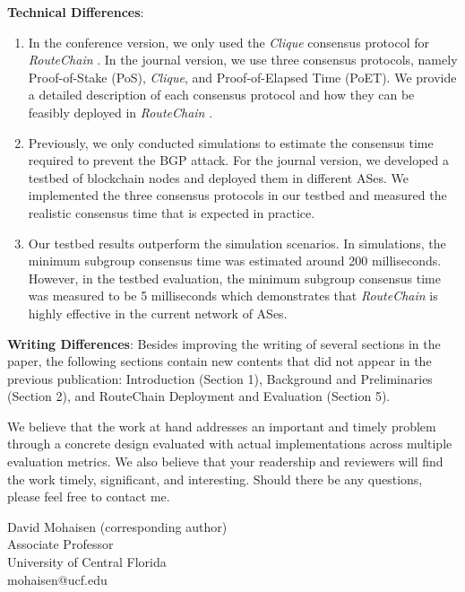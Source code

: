 \documentclass{abmart}
\newcommand{\rc}{{{\em RouteChain }}}
\begin{document}
\noindent\textbf{Technical Differences}:  
\vspace{-4mm}
\begin{enumerate}
\itemsep-0.3em 
    \item In the conference version, we only used the {\em Clique} consensus protocol for \rc. In the journal version, we use three consensus protocols, namely Proof-of-Stake (PoS), {\em Clique}, and Proof-of-Elapsed Time (PoET). We provide a detailed description of each consensus protocol and how they can be feasibly deployed in \rc. 
    \item Previously, we only conducted simulations to estimate the consensus time required to prevent the BGP attack. For the journal version, we developed a testbed of blockchain nodes and deployed them in different ASes. We implemented the three consensus protocols in our testbed and measured the realistic consensus time that is expected in practice. 
    \item Our testbed results outperform the simulation scenarios. In simulations, the minimum subgroup consensus time was estimated around 200 milliseconds. However, in the testbed evaluation, the minimum subgroup consensus time was measured to be 5 milliseconds which demonstrates that \rc is highly effective in the current network of ASes. 
  
\end{enumerate}

\vspace{-3mm}
\noindent\textbf{Writing Differences}: 
Besides improving the writing of several sections in the paper, the following sections contain new contents that did not appear in the previous publication: Introduction (Section 1), Background and Preliminaries (Section 2), and RouteChain Deployment and Evaluation (Section 5). 


We believe that the work at hand addresses an important and timely problem through a concrete design evaluated with actual implementations across multiple evaluation metrics. We also believe that your readership and reviewers will find the work timely, significant, and interesting. Should there be any questions, please feel free to contact me.

David Mohaisen (corresponding author)\\
Associate Professor\\
University of Central Florida\\ 
mohaisen@ucf.edu\\
\end{document}

